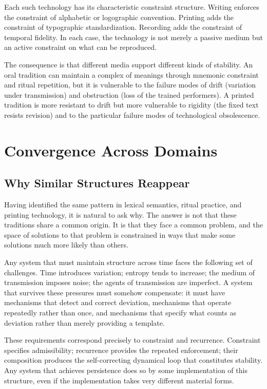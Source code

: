 \documentclass[12pt, oneside]{article}
\theoremstyle{definition}
\theoremstyle{remark}
\begin{document}
Each such technology has its characteristic constraint structure.
Writing enforces the constraint of alphabetic or logographic convention.
Printing adds the constraint of typographic standardization.
Recording adds the constraint of temporal fidelity.
In each case, the technology is not merely a passive medium but an active constraint on what can be reproduced.

The consequence is that different media support different kinds of stability.
An oral tradition can maintain a complex of meanings through mnemonic constraint and ritual repetition, but it is vulnerable to the failure modes of drift (variation under transmission) and obstruction (loss of the trained performers).
A printed tradition is more resistant to drift but more vulnerable to rigidity (the fixed text resists revision) and to the particular failure modes of technological obsolescence.

\section{Convergence Across Domains}

\subsection{Why Similar Structures Reappear}

Having identified the same pattern in lexical semantics, ritual practice, and printing technology, it is natural to ask why.
The answer is not that these traditions share a common origin.
It is that they face a common problem, and the space of solutions to that problem is constrained in ways that make some solutions much more likely than others.

Any system that must maintain structure across time faces the following set of challenges.
Time introduces variation; entropy tends to increase; the medium of transmission imposes noise; the agents of transmission are imperfect.
A system that survives these pressures must somehow compensate: it must have mechanisms that detect and correct deviation, mechanisms that operate repeatedly rather than once, and mechanisms that specify what counts as deviation rather than merely providing a template.

These requirements correspond precisely to constraint and recurrence.
Constraint specifies admissibility; recurrence provides the repeated enforcement; their composition produces the self-correcting dynamical loop that constitutes stability.
Any system that achieves persistence does so by some implementation of this structure, even if the implementation takes very different material forms.
\end{document}
